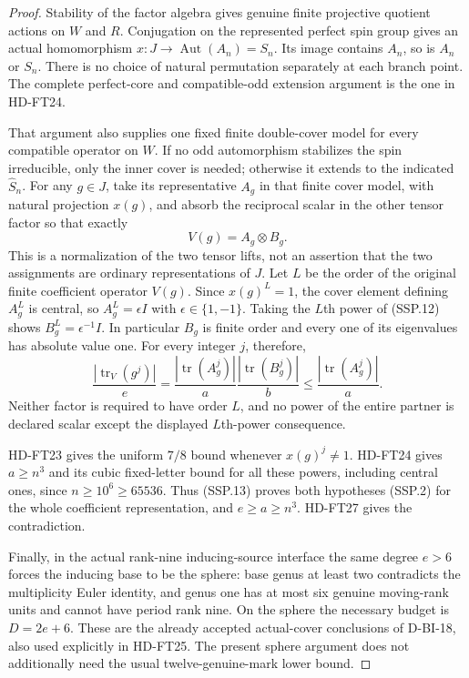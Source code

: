 \begin{proof}
Stability of the factor algebra gives genuine finite projective
quotient actions on $W$ and $R$.  Conjugation on the represented
perfect spin group gives an actual homomorphism
$x:J\longrightarrow\operatorname{Aut}(A_n)=S_n$.
Its image contains $A_n$, so is $A_n$ or $S_n$.
There is no choice of natural permutation separately at each
branch point.  The complete perfect-core and compatible-odd
extension argument is the one in HD-FT24.

That argument also supplies one fixed finite double-cover model
for every compatible operator on $W$.  If no odd automorphism
stabilizes the spin irreducible, only the inner cover is needed;
otherwise it extends to the indicated $\widehat S_n$.
For any $g\in J$, take its representative $A_g$ in that finite
cover model, with natural projection $x(g)$, and absorb the
reciprocal scalar in the other tensor factor so that exactly
\[
                    V(g)=A_g\otimes B_g.
 \tag{SSP.12}
\]
This is a normalization of the two tensor lifts, not an assertion
that the two assignments are ordinary representations of $J$.
Let $L$ be the order of the original finite coefficient operator
$V(g)$.  Since $x(g)^L=1$, the cover element defining $A_g^L$
is central, so $A_g^L=\epsilon I$ with $\epsilon\in\{1,-1\}$.
Taking the $L$th power of (SSP.12) shows
$B_g^L=\epsilon^{-1}I$.  In particular $B_g$ is finite order
and every one of its eigenvalues has absolute value one.
For every integer $j$, therefore,
\[
 \frac{|\operatorname{tr}_V(g^j)|}{e}
 =\frac{|\operatorname{tr}(A_g^j)|}{a}
                 \frac{|\operatorname{tr}(B_g^j)|}{b}
 \le\frac{|\operatorname{tr}(A_g^j)|}{a}.
 \tag{SSP.13}
\]
Neither factor is required to have order $L$, and no power of
the entire partner is declared scalar except the displayed
$L$th-power consequence.

HD-FT23 gives the uniform $7/8$ bound whenever $x(g)^j\ne1$.
HD-FT24 gives $a\ge n^3$ and its cubic fixed-letter bound for
all these powers, including central ones, since
$n\ge10^6\ge65536$.  Thus (SSP.13) proves both hypotheses
(SSP.2) for the whole coefficient representation, and
$e\ge a\ge n^3$.  HD-FT27 gives the contradiction.

Finally, in the actual rank-nine inducing-source interface the
same degree $e>6$ forces the inducing base to be the sphere:
base genus at least two contradicts the multiplicity Euler
identity, and genus one has at most six genuine moving-rank
units and cannot have period rank nine.  On the sphere the
necessary budget is $D=2e+6$.  These are the already accepted
actual-cover conclusions of D-BI-18, also used explicitly in
HD-FT25.  The present sphere argument does not additionally
need the usual twelve-genuine-mark lower bound.
\end{proof}

